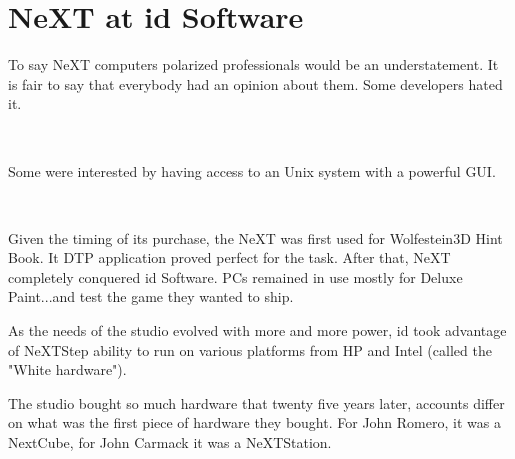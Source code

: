 \section{NeXT at id Software}
To say NeXT computers polarized professionals would be an understatement. It is fair to say that everybody had an opinion about them. Some developers hated it.\\
\par
{}\\
\par
Some were interested by having access to an Unix system with a powerful GUI.\\
\par
{}\\
\par
Given the timing of its purchase, the NeXT was first used for Wolfestein3D Hint Book. It DTP application  proved perfect for the task. After that, NeXT completely conquered id Software. PCs remained in use mostly for Deluxe Paint...and test the game they wanted to ship.\\
\par
As the needs of the studio evolved with more and more power, id took advantage of NeXTStep ability to run on various platforms from HP and Intel (called the "White hardware").\\
\par
The studio bought so much hardware that twenty five years later, accounts differ on what was the first piece of hardware they bought. For John Romero, it was a NextCube, for John Carmack it was a NeXTStation.\\
\par


